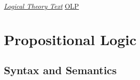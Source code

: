 \documentclass[b5paper]{memoir}
\begin{document}

\begin{titlingpage}

\vfill


\oluselicense
{\href{https://github.com/OpenLogicProject/OpenLogic/tree/master/courses/sample}{\textit{Logical Theory Text}}}
{\href{http://openlogicproject.org/}{OLP}}
\end{titlingpage}

\frontmatter
\pagestyle{ruled}

\tableofcontents*

\mainmatter




\part{Propositional Logic}


\chapter{Syntax and Semantics}

\end{document}
